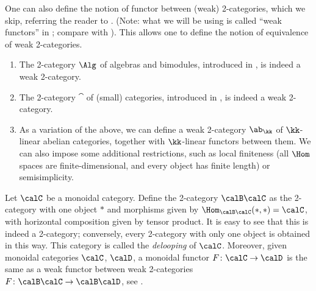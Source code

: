 One can also define the notion of functor between (weak) 2-categories, which we
skip, referring the reader to \cite[Definition 1.5.8]{leinster}. (Note: what
we will be using is called ``weak functors'' in \cite{leinster}; compare with
). This allows one to define the notion of equivalence
of weak 2-categories.


\begin{example}\label{x:weak-2cat-examples}\par\noindent
  \begin{enumerate}
    \item The 2-category $\Alg$ of algebras and bimodules,
      introduced in , is
      indeed a weak 2-category.
    \item The 2-category $\cat$ of (small) categories,
      introduced in , is indeed a weak 2-category.
    \item As a variation of the above, we can define a weak 2-category $\ab_\kk$
      of $\kk$-linear abelian categories, together with $\kk$-linear functors
      between them. We can also impose some additional restrictions, such as
      local finiteness (all $\Hom$ spaces are finite-dimensional, and every
      object has finite length) or semisimplicity.
  \end{enumerate}
\end{example}
\begin{example}\label{x:BC}
  Let $\calC$ be a monoidal category. Define the 2-category $\calB\calC$ as the
  2-category with one object $*$ and morphisms given by $\Hom_{\calB\calC}(*,*)
  =\calC$, with horizontal composition given by tensor product. It is easy to
  see that this is indeed a 2-category; conversely, every 2-category with only
  one object is obtained in this way. This category is called the
  \emph{delooping} of $\calC$. Moreover, given monoidal
  categories $\calC$, $\calD$, a monoidal functor $F\colon \calC\to\calD$ is the
  same as a weak functor between weak 2-categories $F\colon \calB\calC\to
  \calB\calD$, see \cite[Example 1.5.9]{leinster}.
\end{example}

